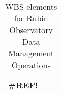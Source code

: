 \normalsize \begin{longtable} {|p{}|l|l|} \caption{WBS elements for Rubin Observatory Data Management Operations \label{tab:dmwbs}}\\ 
\hline 
\textbf{\#REF!}&& \\ \hline
\end{longtable} \normalsize

